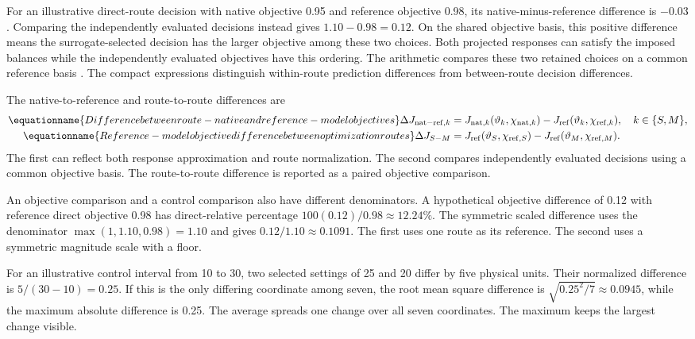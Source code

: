 For an illustrative direct-route decision with native objective 0.95 and reference objective 0.98, its native-minus-reference difference is $-0.03$. Comparing the independently evaluated decisions instead gives $1.10-0.98=0.12$. On the shared objective basis, this positive difference means the surrogate-selected decision has the larger objective among these two choices. Both projected responses can satisfy the imposed balances while the independently evaluated objectives have this ordering. The arithmetic compares these two retained choices on a common reference basis \citep{Alexandrov1998,Pedrozo2025}. The compact expressions distinguish within-route prediction differences from between-route decision differences.

The native-to-reference and route-to-route differences are
\begin{align}
\equationname{Difference between route-native and reference-model objectives}
\Delta J_{{\rm nat-ref},k}&=
J_{{\rm nat},k}(\vartheta_k,\chi_{{\rm nat},k})
-J_{\rm ref}(\vartheta_k,\chi_{{\rm ref},k}),\quad k\in\{S,M\},\\
\equationname{Reference-model objective difference between optimization routes}
\Delta J_{S-M}&=J_{\rm ref}(\vartheta_S,\chi_{{\rm ref},S})
-J_{\rm ref}(\vartheta_M,\chi_{{\rm ref},M}).
\label{eq:plant_objective_comparison}
\end{align}
The first can reflect both response approximation and route normalization. The second compares independently evaluated decisions using a common objective basis. The route-to-route difference is reported as a paired objective comparison.

An objective comparison and a control comparison also have different denominators. A hypothetical objective difference of 0.12 with reference direct objective 0.98 has direct-relative percentage $100(0.12)/0.98\approx12.24\%$. The symmetric scaled difference uses the denominator $\max(1,1.10,0.98)=1.10$ and gives $0.12/1.10\approx0.1091$. The first uses one route as its reference. The second uses a symmetric magnitude scale with a floor.

For an illustrative control interval from 10 to 30, two selected settings of 25 and 20 differ by five physical units. Their normalized difference is $5/(30-10)=0.25$. If this is the only differing coordinate among seven, the root mean square difference is $\sqrt{0.25^2/7}\approx0.0945$, while the maximum absolute difference is 0.25. The average spreads one change over all seven coordinates. The maximum keeps the largest change visible.

